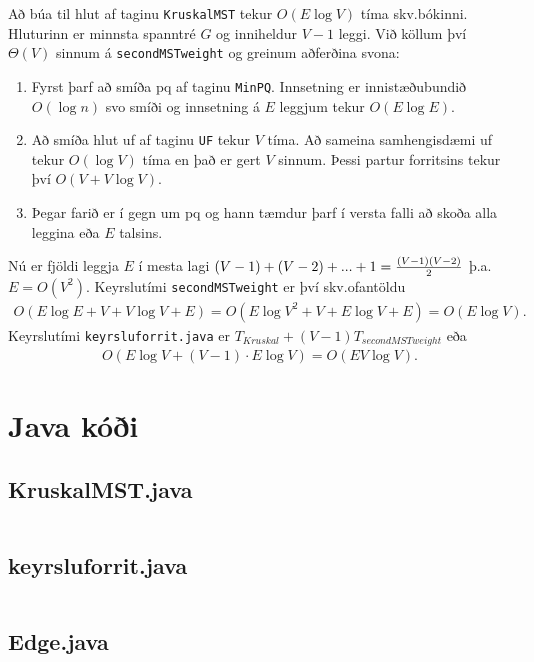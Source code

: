 \documentclass[a4paper,oneside]{article}
\begin{document}
\noindent
Að búa til hlut af taginu \texttt{KruskalMST} tekur $O(E \log V)$ tíma skv.\@ bókinni. Hluturinn er minnsta spanntré $G$ og inniheldur $V-1$ leggi. Við köllum því $\Theta(V)$ sinnum á \texttt{secondMSTweight} og greinum aðferðina svona:
\begin{enumerate}
    \item Fyrst þarf að smíða pq af taginu \texttt{MinPQ}. Innsetning er innistæðubundið $O(\log n)$ svo smíði og innsetning á $E$ leggjum tekur $O(E \log E)$.
    \item Að smíða hlut uf af taginu \texttt{UF} tekur $V$ tíma. Að sameina samhengisdæmi uf tekur $O(\log V)$ tíma en það er gert $V$ sinnum. Þessi partur forritsins tekur því $O(V +  V \log V)$.
    \item Þegar farið er í gegn um pq og hann tæmdur þarf í versta falli að skoða alla leggina eða $E$ talsins.
\end{enumerate}
Nú er fjöldi leggja $E$ í mesta lagi $(V-1) + (V-2) + ... + 1 = {(V-1)(V-2) \over 2}$ þ.a.\@ $E = O(V^2)$. Keyrslutími \texttt{secondMSTweight} er því skv.\@ ofantöldu
\begin{align*}
    O(E \log E + V + V \log V + E) = O(E \log V^2 + V + E \log V + E) = O(E \log V).
\end{align*}
Keyrslutími \texttt{keyrsluforrit.java} er $T_{Kruskal} + (V-1) T_{secondMSTweight}$ eða
\begin{align*}
    O(E \log V + (V-1) \cdot E \log V) = O(EV \log V).
\end{align*}


\pagebreak
\section{Java kóði}
\subsection{KruskalMST.java}
\inputminted[]{java}{../KruskalMST.java}

\subsection{keyrsluforrit.java}
\inputminted[]{java}{../keyrsluforrit.java}

\subsection{Edge.java}
\inputminted[firstline=91,firstnumber=91,lastline=131]{java}{../Edge.java}
\end{document}
